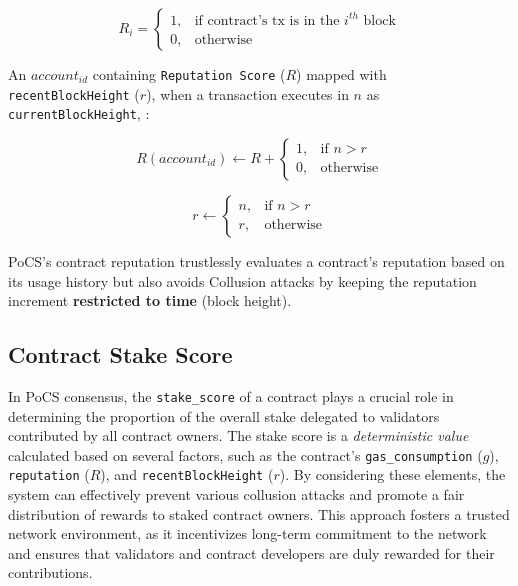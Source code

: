 \documentclass{article}
\begin{document}
\begin{equation}
R_i = \begin{cases} 
     1, & \text{if contract's tx is in the } i^{th} \text{ block} \\
     0, & \text{otherwise}
\end{cases}
\end{equation}

An $account_{id}$ containing \texttt{Reputation Score} ($R$) mapped with \texttt{recentBlockHeight} ($r$), when a transaction executes in $n$ as \texttt{currentBlockHeight}, :

\begin{equation}
R(account_{id}) \leftarrow R + \begin{cases}
    1, & \text{if } n > r \\
    0, & \text{otherwise}
\end{cases}
\end{equation}

\begin{equation}
r \leftarrow \begin{cases}
    n, & \text{if } n > r \\
    r, & \text{otherwise}
\end{cases}
\end{equation}

PoCS's contract reputation trustlessly evaluates a contract's reputation based on its usage history but also avoids Collusion attacks by keeping the reputation increment \textbf{restricted to time} (block height).


\subsection{Contract Stake Score}

In PoCS consensus, the \texttt{stake\_score} of a contract plays a crucial role in determining the proportion of the overall stake delegated to validators contributed by all contract owners. The stake score is a \textit{deterministic value} calculated based on several factors, such as the contract's \texttt{gas\_consumption} ($g$), \texttt{reputation} ($R$), and \texttt{recentBlockHeight} ($r$). By considering these elements, the system can effectively prevent various collusion attacks and promote a fair distribution of rewards to staked contract owners. This approach fosters a trusted network environment, as it incentivizes long-term commitment to the network and ensures that validators and contract developers are duly rewarded for their contributions.
\end{document}
